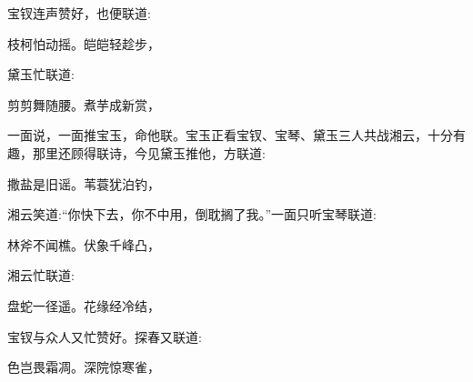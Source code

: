 \begin{parag}
    宝钗连声赞好，也便联道:
\end{parag}


\begin{poem}
    \begin{pl} 枝柯怕动摇。皑皑轻趁步，\end{pl}
\end{poem}


\begin{parag}
    黛玉忙联道:
\end{parag}


\begin{poem}
    \begin{pl} 剪剪舞随腰。煮芋成新赏，\end{pl}
\end{poem}


\begin{parag}
    一面说，一面推宝玉，命他联。宝玉正看宝钗、宝琴、黛玉三人共战湘云，十分有趣，那里还顾得联诗，今见黛玉推他，方联道:
\end{parag}


\begin{poem}
    \begin{pl} 撒盐是旧谣。苇蓑犹泊钓，\end{pl}
\end{poem}


\begin{parag}
    湘云笑道:“你快下去，你不中用，倒耽搁了我。”一面只听宝琴联道:
\end{parag}


\begin{poem}
    \begin{pl} 林斧不闻樵。伏象千峰凸，\end{pl}
\end{poem}


\begin{parag}
    湘云忙联道:
\end{parag}


\begin{poem}
    \begin{pl} 盘蛇一径遥。花缘经冷结，\end{pl}
\end{poem}


\begin{parag}
    宝钗与众人又忙赞好。探春又联道:
\end{parag}


\begin{poem}
    \begin{pl} 色岂畏霜凋。深院惊寒雀，\end{pl}
\end{poem}


